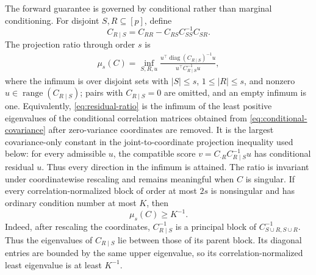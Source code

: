 \documentclass[a4paper,11pt,english]{article}
\begin{document}
The forward guarantee is governed by conditional rather than marginal
conditioning.  For disjoint $S,R\subseteq[p]$, define
\begin{equation}\label{eq:conditional-covariance}
        C_{R\mid S}
        =C_{RR}-C_{RS}C_{SS}^{-1}C_{SR}.
\end{equation}
The projection ratio through order $s$ is
\begin{equation}\label{eq:residual-ratio}
\begin{split}
        \mu_s(C)=
        \inf_{S,R,u}
        \frac{u^\top\operatorname{diag}(C_{R\mid S})^{-1}u}
        {u^\top C_{R\mid S}^{-1}u},
\end{split}
\end{equation}
where the infimum is over disjoint sets with $|S|\le s$,
$1\le|R|\le s$, and nonzero
$u\in\operatorname{range}(C_{R\mid S})$; pairs with
$C_{R\mid S}=0$ are omitted, and an empty infimum is one.  Equivalently,
\eqref{eq:residual-ratio} is the infimum of the least positive
eigenvalues of the conditional correlation matrices obtained from
\eqref{eq:conditional-covariance} after zero-variance coordinates are
removed.  It is the largest covariance-only constant in the
joint-to-coordinate projection inequality used below: for every admissible
$u$, the compatible score
$v=C_{\cdot R}C_{R\mid S}^{-1}u$ has conditional residual $u$.  Thus every
direction in the infimum is attained.  The ratio is
invariant under coordinatewise rescaling and remains meaningful when
$C$ is singular.  If every correlation-normalized block of order at most
$2s$ is nonsingular and has ordinary condition number at most $K$, then
\begin{equation}\label{eq:conditioning-implies-ratio}
        \mu_s(C)\ge K^{-1}.
\end{equation}
Indeed, after rescaling the coordinates, $C_{R\mid S}^{-1}$ is a
principal block of $C_{S\cup R,S\cup R}^{-1}$.  Thus the eigenvalues of
$C_{R\mid S}$ lie between those of its parent block.  Its diagonal
entries are bounded by the same upper eigenvalue, so its
correlation-normalized least eigenvalue is at least $K^{-1}$.
\end{document}
